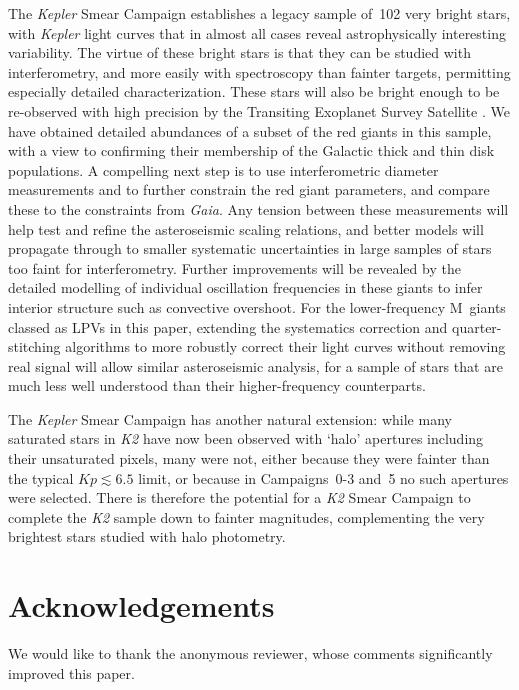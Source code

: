 \documentclass[modern]{aastex62}
\newcommand{\kepler}{\textit{Kepler}\xspace}
\newcommand{\ktwo}{\textit{K2}\xspace}
\newcommand{\gaia}{\textit{Gaia}\xspace}
\begin{document}
The \kepler Smear Campaign establishes a legacy sample of~102 very bright stars, with \kepler light curves that in almost all cases reveal astrophysically interesting variability. The virtue of these bright stars is that they can be studied with interferometry, and more easily with spectroscopy than fainter targets, permitting especially detailed characterization. These stars will also be bright enough to be re-observed with high precision by the Transiting Exoplanet Survey Satellite \citep[TESS;][]{tess}. We have obtained detailed abundances of a subset of the red giants in this sample, with a view to confirming their membership of the Galactic thick and thin disk populations. A compelling next step is to use interferometric diameter measurements and to further constrain the red giant parameters, and compare these to the constraints from \gaia. Any tension between these measurements will help test and refine the asteroseismic scaling relations, and better models will propagate through to smaller systematic uncertainties in large samples of stars too faint for interferometry. Further improvements will be revealed by the detailed modelling of individual oscillation frequencies in these giants to infer interior structure such as convective overshoot. For the lower-frequency M~giants classed as LPVs in this paper, extending the systematics correction and quarter-stitching algorithms to more robustly correct their light curves without removing real signal will allow similar asteroseismic analysis, for a sample of stars that are much less well understood than their higher-frequency counterparts. 

The \kepler Smear Campaign has another natural extension: while many saturated stars in \ktwo have now been observed with `halo' apertures including their unsaturated pixels, many were not, either because they were fainter than the typical $Kp \lesssim 6.5$ limit, or because in Campaigns~0-3 and~5 no such apertures were selected. There is therefore the potential for a \ktwo Smear Campaign to complete the \ktwo sample down to fainter magnitudes, complementing the very brightest stars studied with halo photometry. 


\section*{Acknowledgements} %

We would like to thank the anonymous reviewer, whose comments significantly improved this paper.
\end{document}

